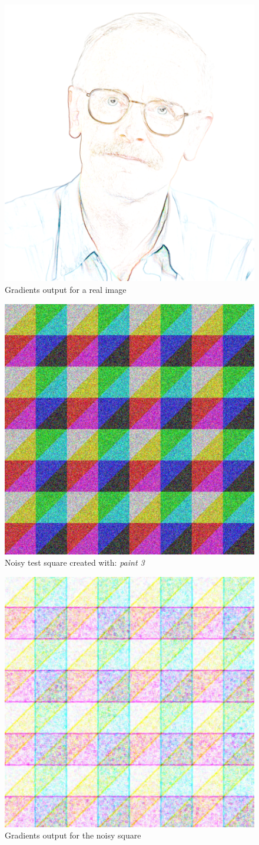\documentclass[11pt,twoside,english,a4paper]{article}
\begin{document}
\begin{figure}[ht!]
\centering
\includegraphics[width=0.618\columnwidth]{spacekg}
\caption[]{Gradients output for a real image}
\label{spacekq}
\end{figure}

\begin{figure}[ht!]
\centering
\includegraphics[width=0.618\columnwidth]{nsquare}
\caption[]{Noisy test square created with: \emph{paint 3}}
\label{nsquare}
\end{figure}

\begin{figure}[ht!]
\centering
\includegraphics[width=0.618\columnwidth]{nsquareg}
\caption[]{Gradients output for the noisy square}
\label{nsquareg}
\end{figure}
\end{document}
